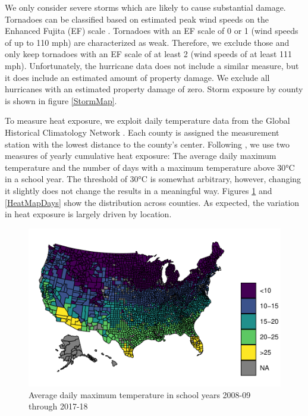 We only consider severe storms which are likely to cause substantial damage. Tornadoes can be classified based on estimated peak wind speeds on the Enhanced Fujita (EF) scale \citep[for more details see][]{EF_Scale}. Tornadoes with an EF scale of 0 or 1 (wind speeds of up to 110 mph) are characterized as weak. Therefore, we exclude those and only keep tornadoes with an EF scale of at least 2 (wind speeds of at least 111 mph). Unfortunately, the hurricane data does not include a similar measure, but it does include an estimated amount of property damage. We exclude all hurricanes with an estimated property damage of zero.  Storm exposure by county is shown in figure \ref{StormMap}.

To measure heat exposure, we exploit daily temperature data from the Global Historical Climatology Network \citep{Menne_2012}. Each county is assigned the measurement station with the lowest distance to the county's center. Following \cite{Park_2020}, we use two measures of yearly cumulative heat exposure: The average daily maximum temperature and the number of days with a maximum temperature above 30°C in a school year. The threshold of 30°C is somewhat arbitrary, however, changing it slightly does not change the results in a meaningful way. Figures \ref{HeatMapTemp} and \ref{HeatMapDays} show the distribution across counties. As expected, the variation in heat exposure is largely driven by location.

\begin{figure}[!h]
	\centering
	\includegraphics[scale=1]{"../Code & Data/HeatMapTemp.pdf"}
	\caption{Average daily maximum temperature in school years 2008-09 through 2017-18}
	\label{HeatMapTemp}
\end{figure}

